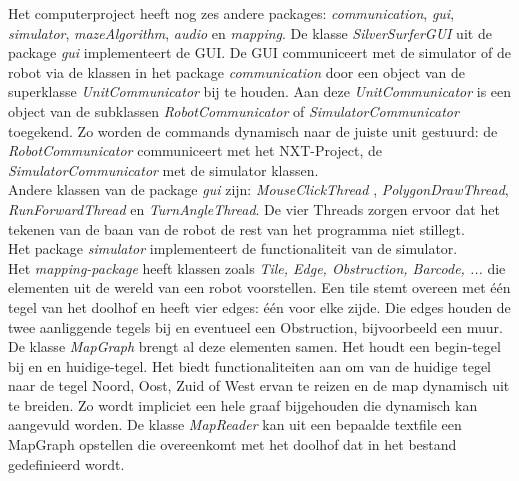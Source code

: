 \documentclass[tt3]{penoverslag}
\begin{document}
Het computerproject heeft nog zes andere packages: \textit{communication}, \textit{gui}, \textit{simulator}, \textit{mazeAlgorithm}, \textit{audio} en \textit{mapping}. 
De klasse \textit{SilverSurferGUI} uit de package \textit{gui} implementeert de GUI. De GUI communiceert met de simulator of de robot via de klassen in het package \textit{communication} door een object van de superklasse \textit{UnitCommunicator} bij te houden. Aan deze \textit{UnitCommunicator} is een object van de subklassen \textit{RobotCommunicator} of \textit{SimulatorCommunicator}  toegekend. Zo worden de commands dynamisch naar de juiste unit gestuurd: de \textit{RobotCommunicator} communiceert met het NXT-Project, de \textit{SimulatorCommunicator} met de simulator klassen.\\
Andere klassen van de package \textit{gui} zijn: \textit{MouseClickThread} , \textit{PolygonDrawThread}, \textit{RunForwardThread} en \textit{TurnAngleThread}. De vier Threads zorgen ervoor dat het tekenen van de baan van de robot de rest van het programma niet stillegt. \\

Het package \textit{simulator} implementeert de functionaliteit van de simulator. \\
Het \textit{mapping-package} heeft klassen zoals \textit{Tile, Edge, Obstruction, Barcode, ...} die elementen uit de wereld van een robot voorstellen. Een tile stemt overeen met \'e\'en tegel van het doolhof en heeft vier edges: \'e\'en voor elke zijde. Die edges houden de twee aanliggende tegels bij en eventueel een Obstruction, bijvoorbeeld een muur. De klasse \textit{MapGraph} brengt al deze elementen samen. Het houdt een begin-tegel bij en en huidige-tegel. Het biedt functionaliteiten aan om van de huidige tegel naar de tegel Noord, Oost, Zuid of West ervan te reizen en de map dynamisch uit te breiden. Zo wordt impliciet een hele graaf bijgehouden die dynamisch kan aangevuld worden. De klasse \textit{MapReader} kan uit een bepaalde textfile een MapGraph opstellen die overeenkomt met het doolhof dat in het bestand gedefinieerd wordt.
\end{document}
